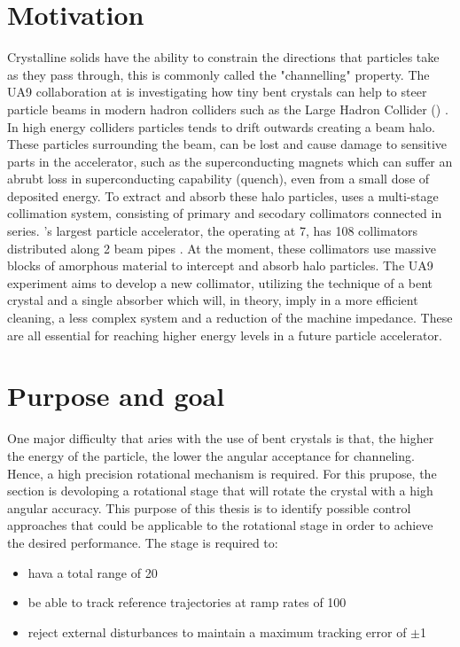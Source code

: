 \section{Motivation}
 Crystalline solids have the ability to constrain the directions that particles take as they pass through, this is commonly called the "channelling" property. The UA9 collaboration at \abbrCERN is investigating how tiny bent crystals can help to steer particle beams in modern hadron colliders such as the Large Hadron Collider (\abbrLHC) \citep{WebsiteUA9:2016}. In high energy colliders particles tends to drift outwards creating a beam halo. These particles surrounding the beam, can be lost and cause damage to sensitive parts in the accelerator, such as the superconducting magnets which can suffer an abrubt loss in superconducting capability (quench), even from a small dose of deposited energy. To extract and absorb these halo particles, \abbrCERN uses a multi-stage collimation system, consisting of primary and secodary collimators connected in series. \abbrCERN's largest particle accelerator, the \abbrLHC operating at \unit{7}{\tera\electronvolt}, has 108 collimators distributed along 2 beam pipes \citep{CrystalCollimation:2015}. At the moment, these collimators use massive blocks of amorphous material to intercept and absorb halo particles. The UA9 experiment aims to develop a new collimator, utilizing the technique of a bent crystal and a single absorber which will, in theory, imply in a more efficient cleaning, a less complex system and a reduction of the machine impedance. These are all essential for reaching higher energy levels in a future particle accelerator.

\section{Purpose and goal}
One major difficulty that aries with the use of bent crystals is that, the higher the energy of the particle, the lower the angular acceptance for channeling. Hence, a high precision rotational mechanism is required. For this prupose, the \abbrECE section is devoloping a rotational stage that will rotate the crystal with a high angular accuracy. This purpose of this thesis is to identify possible control approaches that could be applicable to the rotational stage in order to achieve the desired performance. The stage is required to:
\begin{itemize}
  \item hava a total range of \unit{20}{\milli\rad}
  \item be able to track reference trajectories at ramp rates of \unit{100}{\micro\radianpersecond}
  \item reject external disturbances to maintain a maximum tracking error of $\pm$\unit{1}{\micro\rad}
\end{itemize}

